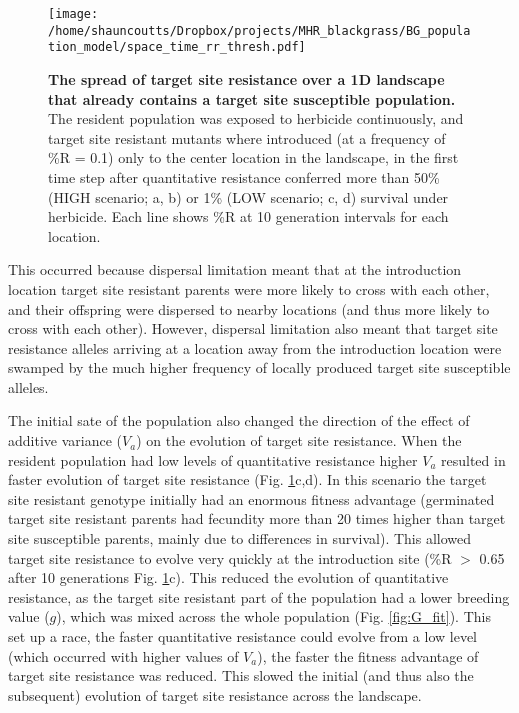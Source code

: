 \documentclass[10pt,letterpaper]{article}
\begin{document}
\begin{figure}[!h] 
\texttt{[image: /home/shauncoutts/Dropbox/projects/MHR\_blackgrass/BG\_population\_model/space\_time\_rr\_thresh.pdf]} 
\caption{{\bf The spread of target site resistance over a 1D landscape that already contains a target site susceptible population.} The resident population was exposed to herbicide continuously, and target site resistant mutants where introduced (at a frequency of \%R = 0.1) only to the center location in the landscape, in the first time step after quantitative resistance conferred more than 50\% (HIGH scenario; a, b) or 1\% (LOW scenario; c, d) survival under herbicide. Each line shows \%R at 10 generation intervals for each location.} 
\label{fig_spread}
\end{figure}

This occurred because dispersal limitation meant that at the introduction location target site resistant parents were more likely to cross with each other, and their offspring were dispersed to nearby locations (and thus more likely to cross with each other). However, dispersal limitation also meant that target site resistance alleles arriving at a location away from the introduction location were swamped by the much higher frequency of locally produced target site susceptible alleles.

The initial sate of the population also changed the direction of the effect of additive variance ($V_a$) on the evolution of target site resistance. When the resident population had low levels of quantitative resistance higher $V_a$ resulted in faster evolution of target site resistance (Fig. \ref{fig_spread}c,d). In this scenario the target site resistant genotype initially had an enormous fitness advantage (germinated target site resistant parents had fecundity more than 20 times higher than target site susceptible parents, mainly due to differences in survival). This allowed target site resistance to evolve very quickly at the introduction site (\%R $>$ 0.65 after 10 generations Fig. \ref{fig_spread}c). This reduced the evolution of quantitative resistance, as the target site resistant part of the population had a lower breeding value ($g$), which was mixed across the whole population (Fig. \ref{fig:G_fit}). This set up a race, the faster quantitative resistance could evolve from a low level (which occurred with higher values of $V_a$), the faster the fitness advantage of target site resistance was reduced. This slowed the initial (and thus also the subsequent) evolution of target site resistance across the landscape.             
\end{document}
